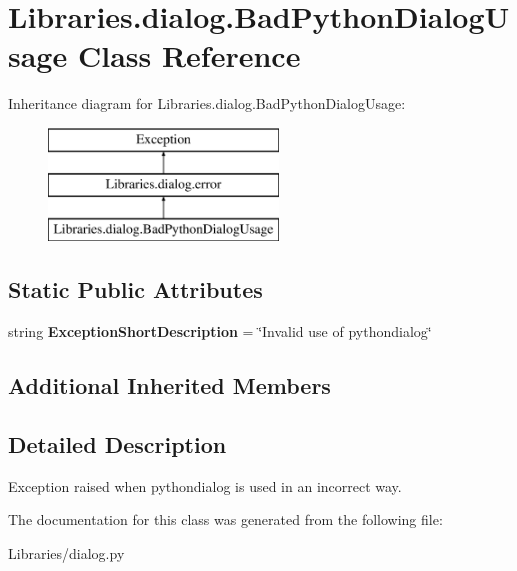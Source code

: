 \hypertarget{class_libraries_1_1dialog_1_1_bad_python_dialog_usage}{}\section{Libraries.\+dialog.\+Bad\+Python\+Dialog\+Usage Class Reference}
\label{class_libraries_1_1dialog_1_1_bad_python_dialog_usage}
Inheritance diagram for Libraries.\+dialog.\+Bad\+Python\+Dialog\+Usage\+:\begin{figure}[H]
\begin{center}
\leavevmode
\includegraphics[height=3.000000cm]{class_libraries_1_1dialog_1_1_bad_python_dialog_usage}
\end{center}
\end{figure}
\subsection*{Static Public Attributes}
\begin{DoxyCompactItemize}
\item 
string {\bfseries Exception\+Short\+Description} = \char`\"{}Invalid use of pythondialog\char`\"{}\hypertarget{class_libraries_1_1dialog_1_1_bad_python_dialog_usage_a338de71eac2879411d644c53b4551a2b}{}\label{class_libraries_1_1dialog_1_1_bad_python_dialog_usage_a338de71eac2879411d644c53b4551a2b}

\end{DoxyCompactItemize}
\subsection*{Additional Inherited Members}


\subsection{Detailed Description}
\begin{DoxyVerb}Exception raised when pythondialog is used in an incorrect way.\end{DoxyVerb}
 

The documentation for this class was generated from the following file\+:\begin{DoxyCompactItemize}
\item 
Libraries/dialog.\+py\end{DoxyCompactItemize}
